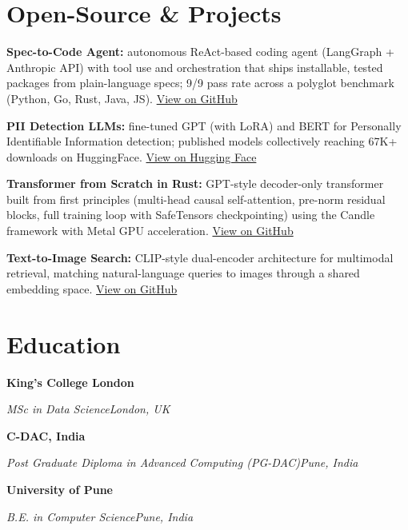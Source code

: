 \documentclass[10pt,a4paper]{article}
\newcommand{\entry}[4]{%
  {\color{company}\bfseries #1}\hfill {\color{muted}#2}\par
  \vspace{1pt}
  {\itshape #3}\hfill {\color{muted}\itshape #4}\par
  \vspace{3pt}%
}
\begin{document}
\section{Open-Source \& Projects}
\begin{tight}
  \item \textbf{Spec-to-Code Agent:} autonomous ReAct-based coding agent (LangGraph + Anthropic API) with tool use and orchestration that ships installable, tested packages from plain-language specs; 9/9 pass rate across a polyglot benchmark (Python, Go, Rust, Java, JS). \href{https://github.com/abhijeetscode/Spec-to-Code-Agent}{View on GitHub}
  \item \textbf{PII Detection LLMs:} fine-tuned GPT (with LoRA) and BERT for Personally Identifiable Information detection; published models collectively reaching 67K+ downloads on HuggingFace. \href{https://huggingface.co/ab-ai/pii_model}{View on Hugging Face}
  \item \textbf{Transformer from Scratch in Rust:} GPT-style decoder-only transformer built from first principles (multi-head causal self-attention, pre-norm residual blocks, full training loop with SafeTensors checkpointing) using the Candle framework with Metal GPU acceleration. \href{https://github.com/abhijeetscode/transformer-rust}{View on GitHub}
  \item \textbf{Text-to-Image Search:} CLIP-style dual-encoder architecture for multimodal retrieval, matching natural-language queries to images through a shared embedding space. \href{https://github.com/abhijeetscode/text-to-image-search}{View on GitHub}
\end{tight}

\section{Education}
\entry{King's College London}{}{MSc in Data Science}{London, UK}
\vspace{-3pt}
\entry{C-DAC, India}{}{Post Graduate Diploma in Advanced Computing (PG-DAC)}{Pune, India}
\vspace{-3pt}
\entry{University of Pune}{}{B.E. in Computer Science}{Pune, India}
\end{document}
